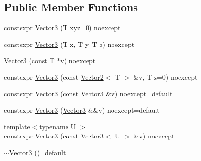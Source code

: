 \subsection*{Public Member Functions}
\begin{DoxyCompactItemize}
\item 
constexpr \hyperlink{structmage_1_1_vector3_3_01_t_00_01typename_01std_1_1enable__if__t_3_01std_1_1is__arithmetic__v_3_01_t_01_4_00_01void_01_4_01_4_a0117bdc2193ba4c35ca45ac6f7010105}{Vector3} (T xyz=0) noexcept
\item 
constexpr \hyperlink{structmage_1_1_vector3_3_01_t_00_01typename_01std_1_1enable__if__t_3_01std_1_1is__arithmetic__v_3_01_t_01_4_00_01void_01_4_01_4_a2c82ab4c6e804c4cb7e4732e8e758519}{Vector3} (T x, T y, T z) noexcept
\item 
\hyperlink{structmage_1_1_vector3_3_01_t_00_01typename_01std_1_1enable__if__t_3_01std_1_1is__arithmetic__v_3_01_t_01_4_00_01void_01_4_01_4_abd114b3da80a3e0f646b8deca52dfb69}{Vector3} (const T $\ast$v) noexcept
\item 
constexpr \hyperlink{structmage_1_1_vector3_3_01_t_00_01typename_01std_1_1enable__if__t_3_01std_1_1is__arithmetic__v_3_01_t_01_4_00_01void_01_4_01_4_a9b29707c44e6950aa6e2fc911f636ea1}{Vector3} (const \hyperlink{structmage_1_1_vector2}{Vector2}$<$ T $>$ \&v, T z=0) noexcept
\item 
constexpr \hyperlink{structmage_1_1_vector3_3_01_t_00_01typename_01std_1_1enable__if__t_3_01std_1_1is__arithmetic__v_3_01_t_01_4_00_01void_01_4_01_4_a09f0493a13609af3056dc09262eea5c9}{Vector3} (const \hyperlink{structmage_1_1_vector3}{Vector3} \&v) noexcept=default
\item 
constexpr \hyperlink{structmage_1_1_vector3_3_01_t_00_01typename_01std_1_1enable__if__t_3_01std_1_1is__arithmetic__v_3_01_t_01_4_00_01void_01_4_01_4_a9acbe2a9130260361f9c3d93083d5bc1}{Vector3} (\hyperlink{structmage_1_1_vector3}{Vector3} \&\&v) noexcept=default
\item 
{\footnotesize template$<$typename U $>$ }\\constexpr \hyperlink{structmage_1_1_vector3_3_01_t_00_01typename_01std_1_1enable__if__t_3_01std_1_1is__arithmetic__v_3_01_t_01_4_00_01void_01_4_01_4_a81eab600fbb447eece879545c15f92d1}{Vector3} (const \hyperlink{structmage_1_1_vector3}{Vector3}$<$ U $>$ \&v) noexcept
\item 
\hyperlink{structmage_1_1_vector3_3_01_t_00_01typename_01std_1_1enable__if__t_3_01std_1_1is__arithmetic__v_3_01_t_01_4_00_01void_01_4_01_4_a01a75dbf011b45844d1b1521d00d3b5f}{$\sim$\+Vector3} ()=default

\end{DoxyCompactItemize}
